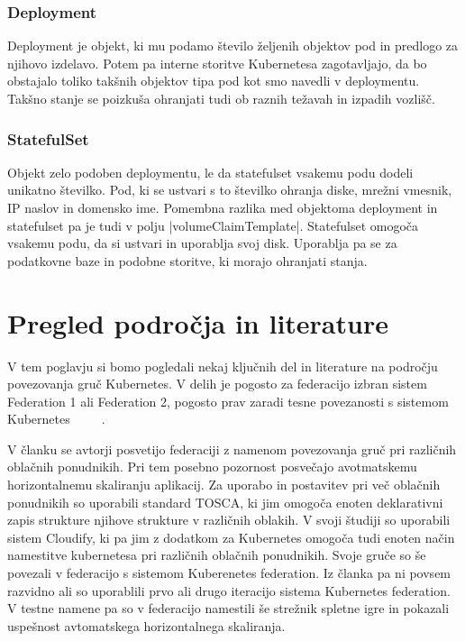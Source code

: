 \documentclass[a4paper, 12pt]{book}
\begin{document}
\subsection{Deployment~\cite{deployment}}
Deployment je objekt, ki mu podamo število željenih objektov pod in predlogo za njihovo izdelavo.
Potem pa interne storitve Kubernetesa zagotavljajo, da bo obstajalo toliko takšnih objektov tipa pod kot smo navedli v deploymentu.
Takšno stanje se poizkuša ohranjati tudi ob raznih težavah in izpadih vozlišč.
\subsection{StatefulSet~\cite{statefulset}}
Objekt zelo podoben deploymentu, le da statefulset vsakemu podu dodeli unikatno številko. 
Pod, ki se ustvari s to številko ohranja diske, mrežni vmesnik, IP naslov in domensko ime.
Pomembna razlika med objektoma deployment in statefulset pa je tudi v polju \spverb|volumeClaimTemplate|.
Statefulset omogoča vsakemu podu, da si ustvari in uporablja svoj disk.
Uporablja pa se za podatkovne baze in podobne storitve, ki morajo ohranjati stanja.
\chapter{Pregled področja in literature}
V tem poglavju si bomo pogledali nekaj ključnih del in literature na področju povezovanja gruč Kubernetes.
V delih je pogosto za federacijo izbran sistem Federation 1 ali Federation 2, pogosto prav zaradi tesne povezanosti s sistemom Kubernetes ~\cite{tosca-fed} ~\cite{dyn-place} ~\cite{kube-and-edge}.


V članku \cite{tosca-fed} se avtorji posvetijo federaciji z namenom povezovanja gruč pri različnih oblačnih ponudnikih.
Pri tem posebno pozornost posvečajo avotmatskemu horizontalnemu skaliranju aplikacij.
Za uporabo in postavitev pri več oblačnih ponudnikih so uporabili standard TOSCA, ki jim omogoča enoten deklarativni zapis strukture njihove strukture v različnih oblakih.
V svoji študiji so uporabili sistem Cloudify, ki pa jim z dodatkom za Kubernetes omogoča tudi enoten način namestitve kubernetesa pri različnih oblačnih ponudnikih.
Svoje gruče so še povezali v federacijo s sistemom Kuberenetes federation. 
Iz članka pa ni povsem razvidno ali so uporablili prvo ali drugo iteracijo sistema Kubernetes federation.
V testne namene pa so v federacijo namestili še strežnik spletne igre in pokazali uspešnost avtomatskega horizontalnega skaliranja.
\end{document}
